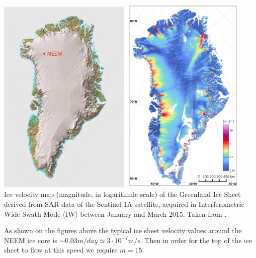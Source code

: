 \begin{center}
\includegraphics[width=6.4cm]{python_codes/fieldstone_59/images/neem}
\includegraphics[width=6cm]{python_codes/fieldstone_59/images/narh15}\\
{\captionfont Ice velocity map (magnitude, in logarithmic scale) of the Greenland Ice Sheet
derived from SAR data of the Sentinel-1A satellite, acquired in Interferometric Wide Swath
Mode (IW) between January and March 2015. Taken from \cite{narh15}.}
\end{center}
As shown on the figures above the typical ice sheet velocity values around the NEEM ice core 
is $\sim 0.03m/day \simeq 3\cdot 10^{-7}$m/s. 
Then in order for the top of the ice sheet to flow at this speed we require $m=15$.

